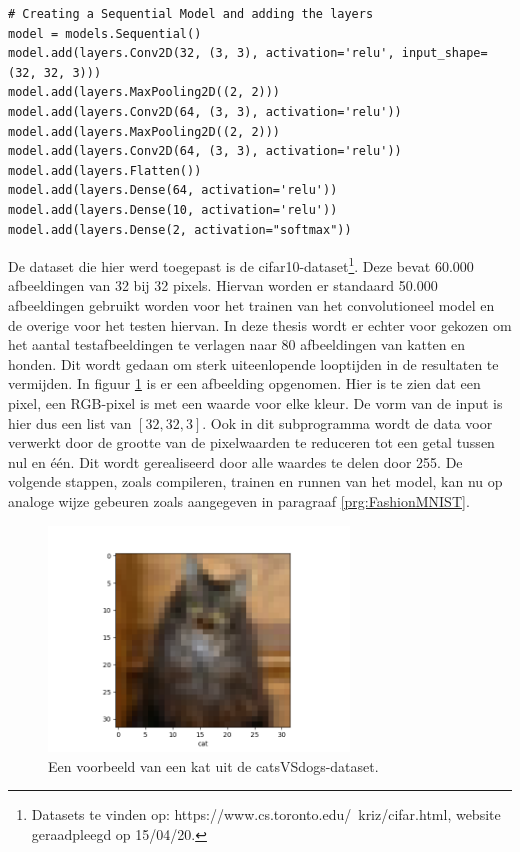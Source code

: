 \begin{lstlisting}[caption={Structuur van het \gls{cnn} catsVSdogs.}, captionpos=b,label={lst:catsVSdogsmodel}]
# Creating a Sequential Model and adding the layers
model = models.Sequential()
model.add(layers.Conv2D(32, (3, 3), activation='relu', input_shape=(32, 32, 3)))
model.add(layers.MaxPooling2D((2, 2)))
model.add(layers.Conv2D(64, (3, 3), activation='relu'))
model.add(layers.MaxPooling2D((2, 2)))
model.add(layers.Conv2D(64, (3, 3), activation='relu'))
model.add(layers.Flatten())
model.add(layers.Dense(64, activation='relu'))
model.add(layers.Dense(10, activation='relu'))
model.add(layers.Dense(2, activation="softmax"))
\end{lstlisting}	
		
		
		De dataset die hier werd toegepast is de cifar10-dataset\footnote{Datasets te vinden op: https://www.cs.toronto.edu/~kriz/cifar.html, website geraadpleegd op 15/04/20.}. Deze bevat 60.000 afbeeldingen van 32 bij 32 pixels. Hiervan worden er standaard 50.000 afbeeldingen gebruikt worden voor het trainen van het convolutioneel model en de overige voor het testen hiervan. In deze thesis wordt er echter voor gekozen om het aantal testafbeeldingen te verlagen naar 80 afbeeldingen van katten en honden. Dit wordt gedaan om sterk uiteenlopende looptijden in de resultaten te vermijden. In figuur \ref{fig:catsVSdogs1} is er een afbeelding opgenomen. Hier is te zien dat een pixel, een RGB-pixel is met een waarde voor elke kleur. De vorm van de input is hier dus een list van $[32, 32, 3]$. Ook in dit subprogramma wordt de data voor verwerkt door de grootte van de pixelwaarden te reduceren tot een getal tussen nul en \'e\'en. Dit wordt gerealiseerd door alle waardes te delen door 255. De volgende stappen, zoals compileren, trainen en runnen van het model, kan nu op analoge wijze gebeuren zoals aangegeven in paragraaf \ref{prg:FashionMNIST}.

		\begin{figure}
			\centering
			\includegraphics[width=80mm]{afbeeldingen/catsVSdogs1.PNG}
			\caption{Een voorbeeld van een kat uit de catsVSdogs-dataset.}
			\label{fig:catsVSdogs1}
		\end{figure}
		

